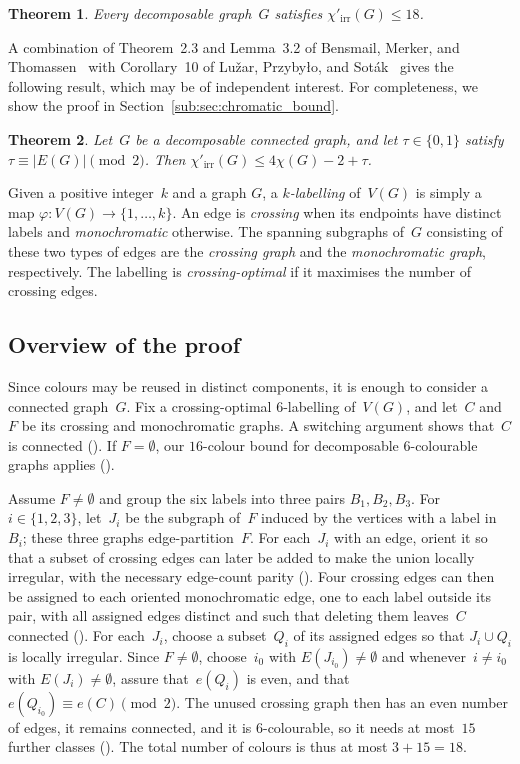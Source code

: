 \documentclass[12pt,reqno,a4paper]{amsart}
\newtheorem{theorem}{Theorem}[section]
\newcommand{\lir}{\chi'_{\mathrm{irr}}}
\begin{document}
\begin{theorem}\label{thm:global18}
  Every decomposable graph~$G$ satisfies $\lir(G) \le 18$.
\end{theorem}

A combination of Theorem~2.3 and Lemma~3.2 of Bensmail, Merker, and
Thomassen~\cite{BeMeTh17} with Corollary~10 of Lu\v{z}ar, Przyby{\l}o, and
Sot\'ak~\cite{LuPrSo18} gives the following result, which may be of independent
interest.
For completeness, we show the proof in Section~\ref{sub:sec:chromatic_bound}.

\begin{theorem}\label{thm:chromatic-bound}
  Let~$G$ be a decomposable connected graph, and let $\tau \in \{0,1\}$ satisfy
  $\tau \equiv |E(G)| \pmod 2$. 
  Then $\lir(G) \le 4\chi(G) - 2 + \tau$.
\end{theorem}

Given a positive integer~$k$ and a graph $G$, a \emph{$k$-labelling} of~$V(G)$
is simply a map $\varphi\colon V(G)\to\{1,\ldots,k\}$. 
An edge is \emph{crossing} when its endpoints have distinct labels and
\emph{monochromatic} otherwise. 
The spanning subgraphs of~$G$ consisting of these two types of edges are the
\emph{crossing graph} and the \emph{monochromatic graph}, respectively. 
The labelling is \emph{crossing-optimal} if it maximises the number of crossing
edges.

\subsection*{Overview of the proof}
Since colours may be reused in distinct components, it is enough to consider a
connected graph~$G$. 
Fix a crossing-optimal $6$-labelling of~$V(G)$, and let~$C$ and~$F$ be its
crossing and monochromatic graphs. 
A switching argument shows that~$C$ is connected (). 
If $F=\emptyset$, our $16$-colour bound for decomposable $6$-colourable graphs
applies ().

Assume $F\neq\emptyset$ and group the six labels into three pairs
$B_1, B_2, B_3$. 
For $i \in \{1,2,3\}$, let~$J_i$ be the subgraph of~$F$ induced by the vertices
with a label in~$B_i$; these three graphs edge-partition~$F$.
For each~$J_i$ with an edge, orient it so that a subset of crossing edges can
later be added to make the union locally irregular, with the necessary 
edge-count parity (). 
Four crossing edges can then be assigned to each oriented monochromatic edge,
one to each label outside its pair, with all assigned edges distinct and such
that deleting them leaves~$C$ connected (). 
For each~$J_i$, choose a subset~$Q_i$ of its assigned edges so that $J_i \cup
Q_i$ is locally irregular. 
Since $F \neq \emptyset$, choose~$i_0$ with $E(J_{i_0}) \neq \emptyset$ and
whenever~$i \neq i_0$ with $E(J_i) \neq \emptyset$, assure that~$e(Q_i)$ is even,
and that $e(Q_{i_0}) \equiv e(C) \pmod 2$. 
The unused crossing graph then has an even number of edges, it remains
connected, and it is $6$-colourable, so it needs at most~$15$ further classes
(). 
The total number of colours is thus at most $3+15=18$.
\end{document}
